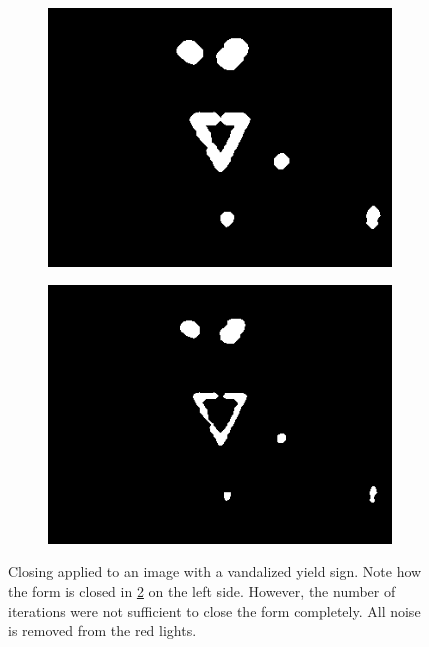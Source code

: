 \documentclass{report}
\begin{document}
\begin{figure}
\begin{subfigure}[t]{0.5\textwidth}
    \includegraphics[width=1\textwidth]{src/closing_2}
  \end{subfigure}
  \quad
  \begin{subfigure}[t]{0.5\textwidth}
    \includegraphics[width=1\textwidth]{src/closing_3}
    \label{subcap:erosion}
  \end{subfigure}
  \caption{Closing applied to an image with a vandalized yield
    sign. Note how the form is closed in \ref{subcap:erosion} on the
    left side. However, the number of iterations were not sufficient
    to close the form completely. All noise is removed from the red
    lights.}
\end{figure}
\end{document}
